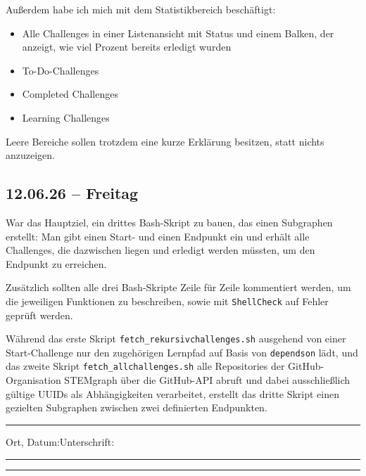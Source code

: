 {Außerdem habe ich mich mit dem Statistikbereich beschäftigt:

\begin{itemize}
  \item Alle Challenges in einer Listenansicht mit Status und einem Balken, der
        anzeigt, wie viel Prozent bereits erledigt wurden
  \item To-Do-Challenges
  \item Completed Challenges
  \item Learning Challenges
\end{itemize}

Leere Bereiche sollen trotzdem eine kurze Erklärung besitzen, statt nichts anzuzeigen.
\subsection{12.06.26 -- Freitag}

War das Hauptziel, ein drittes Bash-Skript zu bauen, das einen Subgraphen erstellt:
Man gibt einen Start- und einen Endpunkt ein und erhält alle Challenges, die
dazwischen liegen und erledigt werden müssten, um den Endpunkt zu erreichen.

Zusätzlich sollten alle drei Bash-Skripte Zeile für Zeile kommentiert werden, um
die jeweiligen Funktionen zu beschreiben, sowie mit \texttt{ShellCheck} auf Fehler
geprüft werden.

Während das erste Skript \texttt{fetch\_rekursivchallenges.sh} ausgehend von einer
Start-Challenge nur den zugehörigen Lernpfad auf Basis von \texttt{dependson} lädt,
und das zweite Skript \texttt{fetch\_allchallenges.sh} alle Repositories der
GitHub-Organisation STEMgraph über die GitHub-API abruft und dabei ausschließlich
gültige UUIDs als Abhängigkeiten verarbeitet, erstellt das dritte Skript einen
gezielten Subgraphen zwischen zwei definierten Endpunkten.
}

\vfill
\noindent\rule{\linewidth}{0.2pt}

\noindent Ort, Datum:\hfill Unterschrift:\\[0.5cm]
\noindent \rule{6cm}{0.9pt}\hfill \rule{6cm}{0.9pt}

\restoregeometry
\newpage


\vspace*{-2cm}

